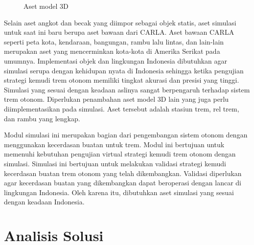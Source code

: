\begin{figure}[!tb]
	\hfill
	\hfill
	\caption{Aset model 3D \parencite{rispro-trilaksono}}
	\label{fig:3d-model-assets}
\end{figure}

Selain aset angkot dan becak yang diimpor sebagai objek statis, aset simulasi
untuk saat ini baru berupa aset bawaan dari CARLA. Aset bawaan CARLA seperti
peta kota, kendaraan, bangungan, rambu lalu lintas, dan lain-lain merupakan aset
yang mencerminkan kota-kota di Amerika Serikat pada umumnya. Implementasi objek
dan lingkungan Indonesia dibutuhkan agar simulasi serupa dengan kehidupan nyata
di Indonesia sehingga ketika pengujian strategi kemudi trem otonom memiliki
tingkat akurasi dan presisi yang tinggi. Simulasi yang sesuai dengan keadaan
aslinya sangat berpengaruh terhadap sistem trem otonom. Diperlukan penambahan
aset model 3D lain yang juga perlu diimplementasikan pada simulasi. Aset
tersebut adalah stasiun trem, rel trem, dan rambu yang lengkap.

Modul simulasi ini merupakan bagian dari pengembangan sistem otonom dengan
menggunakan kecerdasan buatan untuk trem. Modul ini bertujuan untuk memenuhi
kebutuhan pengujian virtual strategi kemudi trem otonom dengan simulasi.
Simulasi ini bertujuan untuk melakukan validasi strategi kemudi kecerdasan
buatan trem otonom yang telah dikembangkan. Validasi diperlukan agar kecerdasan
buatan yang dikembangkan dapat beroperasi dengan lancar di lingkungan Indonesia.
Oleh karena itu, dibutuhkan aset simulasi yang sesuai dengan keadaan Indonesia.

\section{Analisis Solusi}

